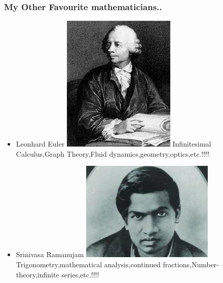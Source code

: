 \documentclass{beamer}
\begin{document}
\begin{frame}
\frametitle{My Other Favourite mathematicians..}
\begin{itemize}
\item  
\begin{block}{Leonhard Euler}
\includegraphics[scale=0.2]{euler.jpg}
      Infinitesimal Calculus,Graph Theory,Fluid dynamics,geometry,optics,etc.!!!!
\end{block}
\item  
\begin{block}{Srinivasa Ramanujam}
\includegraphics[scale=0.2]{ramanujam.jpg}
      Trigonometry,mathematical analysis,continued fractions,Number-theory,infinite series,etc.!!!!
\end{block}
\end{itemize}
\end{frame}
\end{document}
